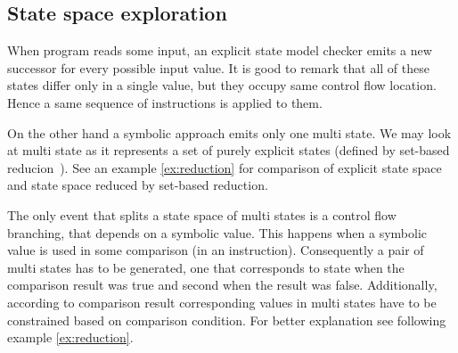\subsection{State space exploration}

When program reads some input, an explicit state model checker emits a
new successor for every possible input value. It is good to remark that all of
these states differ only in a single value, but they occupy same control flow
location. Hence a same sequence of instructions is applied to them.


On the other hand a symbolic approach emits only one multi state. We may look at
multi state as it represents a set of purely explicit states (defined by
set-based reducion~\cite{Havel14}). See an example \ref{ex:reduction} for comparison of
explicit state space and state space reduced by set-based reduction.

The only event that splits a state space of multi states is a control flow branching,
that depends on a symbolic value. This happens when a symbolic value is used in
some comparison (in \LLVM an  instruction). Consequently a pair of
multi states has to be generated, one that corresponds to state when the
comparison result was true and second when the result was false. Additionally,
according to comparison result corresponding values in multi states have
to be constrained based on comparison condition. For better explanation see
following example \ref{ex:reduction}.


